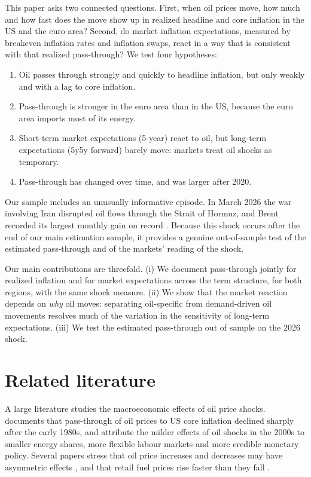 \documentclass[11pt,a4paper]{article}
\begin{document}
This paper asks two connected questions. First, when oil prices move, how much and how fast does the move show up in realized headline and core inflation in the US and the euro area? Second, do market inflation expectations, measured by breakeven inflation rates and inflation swaps, react in a way that is consistent with that realized pass-through? We test four hypotheses:
\begin{enumerate}[label=\textbf{H\arabic*.},leftmargin=2.2em,itemsep=0.1em]
\item Oil passes through strongly and quickly to headline inflation, but only weakly and with a lag to core inflation.
\item Pass-through is stronger in the euro area than in the US, because the euro area imports most of its energy.
\item Short-term market expectations (5-year) react to oil, but long-term expectations (5y5y forward) barely move: markets treat oil shocks as temporary.
\item Pass-through has changed over time, and was larger after 2020.
\end{enumerate}

Our sample includes an unusually informative episode. In March 2026 the war involving Iran disrupted oil flows through the Strait of Hormuz, and Brent recorded its largest monthly gain on record \citep{reuters2026}. Because this shock occurs after the end of our main estimation sample, it provides a genuine out-of-sample test of the estimated pass-through and of the markets' reading of the shock.

Our main contributions are threefold. (i) We document pass-through jointly for realized inflation and for market expectations across the term structure, for both regions, with the same shock measure. (ii) We show that the market reaction depends on \emph{why} oil moves: separating oil-specific from demand-driven oil movements resolves much of the variation in the sensitivity of long-term expectations. (iii) We test the estimated pass-through out of sample on the 2026 shock.

\section{Related literature}

A large literature studies the macroeconomic effects of oil price shocks. \citet{hooker2002} documents that pass-through of oil prices to US core inflation declined sharply after the early 1980s, and \citet{blanchard2010} attribute the milder effects of oil shocks in the 2000s to smaller energy shares, more flexible labour markets and more credible monetary policy. Several papers stress that oil price increases and decreases may have asymmetric effects \citep{mork1989}, and that retail fuel prices rise faster than they fall \citep{peltzman2000}.
\end{document}
